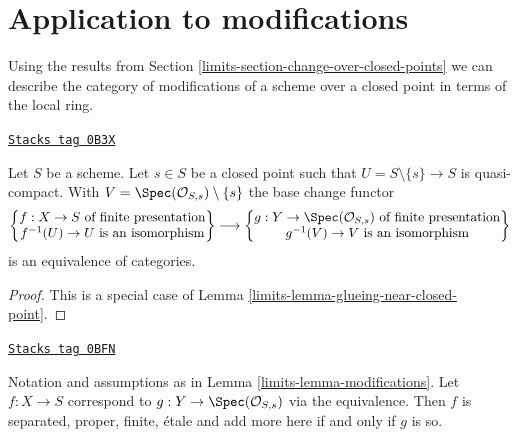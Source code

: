 \section{Application to modifications}
\label{limits-section-modifications-at-a-point}
Using the results from Section \ref{limits-section-change-over-closed-points}
we can describe the category of modifications of
a scheme over a closed point in terms of the local ring.

\begin{lemma}[Modifications]
\label{limits-lemma-modifications}
\href{https://stacks.math.columbia.edu/tag/0B3X}{\texttt{Stacks tag 0B3X}}

Let $S$ be a scheme. Let $s \in S$ be a closed point such that
$U = S \setminus \{s\} \to S$ is quasi-compact. With
$V = \Spec(\mathcal{O}_{S, s}) \setminus \{s\}$ the base change functor
$$
\left\{
\begin{matrix}
f : X \to S\text{ of finite presentation} \\
f^{-1}(U) \to U\text{ is an isomorphism}
\end{matrix}
\right\}
\longrightarrow
\left\{
\begin{matrix}
g : Y \to \Spec(\mathcal{O}_{S, s})\text{ of finite presentation} \\
g^{-1}(V) \to V\text{ is an isomorphism}
\end{matrix}
\right\}
$$
is an equivalence of categories.
\end{lemma}

\begin{proof}

This is a special case of Lemma \ref{limits-lemma-glueing-near-closed-point}.
\end{proof}

\begin{lemma}
\label{limits-lemma-modifications-properties}
\href{https://stacks.math.columbia.edu/tag/0BFN}{\texttt{Stacks tag 0BFN}}

Notation and assumptions as in Lemma \ref{limits-lemma-modifications}.
Let $f : X \to S$ correspond to $g : Y \to \Spec(\mathcal{O}_{S, s})$
via the equivalence. Then $f$ is separated, proper, finite, \'etale
and add more here if and only if $g$ is so.
\end{lemma}

